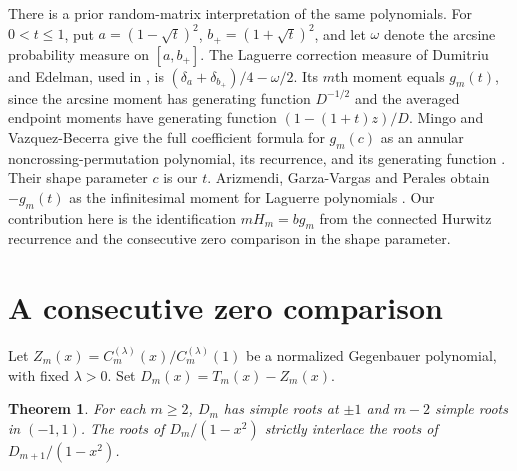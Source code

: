 \documentclass[11pt]{article}
\newtheorem{theorem}{Theorem}
\begin{document}
There is a prior random-matrix interpretation of the same polynomials.
For $0<t\le1$, put $a=(1-\sqrt t)^2$, $b_+=(1+\sqrt t)^2$,
and let $\omega$ denote the arcsine probability measure on $[a,b_+]$.
The Laguerre correction measure of Dumitriu and Edelman, used in
\cite[Theorem~1.5]{de}, is $(\delta_a+\delta_{b_+})/4-\omega/2$.
Its $m$th moment equals $g_m(t)$, since the arcsine moment has generating
function $D^{-1/2}$ and the averaged endpoint moments have generating
function $(1-(1+t)z)/D$.
Mingo and Vazquez-Becerra give the full coefficient formula for $g_m(c)$
as an annular noncrossing-permutation polynomial, its recurrence, and its
generating function \cite[Prop.~19 and Thms.~42, 43, 45]{mv}. Their
shape parameter $c$ is our $t$. Arizmendi, Garza-Vargas and Perales obtain
$-g_m(t)$ as the infinitesimal moment for Laguerre polynomials
\cite[Ex.~5.9, Eq.~(38)]{agp}. Our contribution here is the identification
$mH_m=b g_m$ from the connected Hurwitz recurrence and the consecutive
zero comparison in the shape parameter.

\section{A consecutive zero comparison}
Let $Z_m(x)=C_m^{(\lambda)}(x)/C_m^{(\lambda)}(1)$ be a normalized Gegenbauer polynomial, with fixed $\lambda>0$. Set $D_m(x)=T_m(x)-Z_m(x)$.
\begin{theorem}\label{orth}
For each $m\ge2$, $D_m$ has simple roots at $\pm1$ and $m-2$ simple roots in $(-1,1)$. The roots of $D_m/(1-x^2)$ strictly interlace the roots of $D_{m+1}/(1-x^2)$.
\end{theorem}
\end{document}
